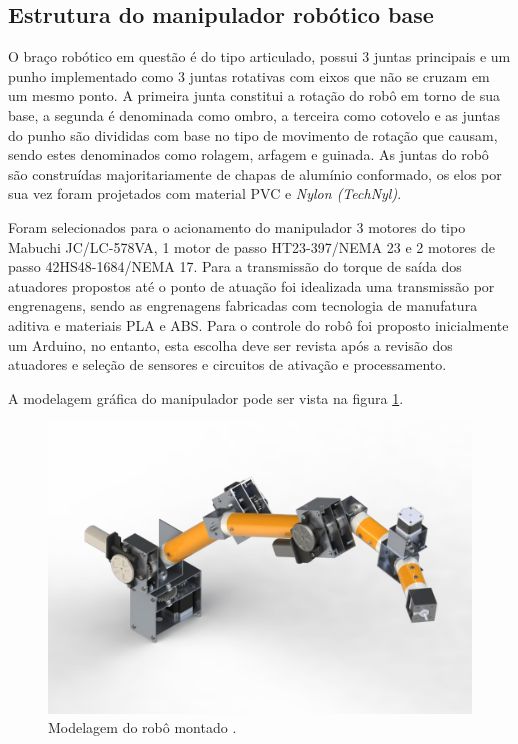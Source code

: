 \subsection{Estrutura do manipulador robótico base}
\label{sec:EstruturaBase}

O braço robótico em questão é do tipo articulado, possui 3 juntas principais e um punho implementado como 3 juntas rotativas com eixos que não se cruzam em um
mesmo ponto. A primeira junta constitui a rotação do robô em torno de sua base, a segunda é denominada como ombro, a terceira como cotovelo e as juntas do 
punho são divididas com base no tipo de movimento de rotação que causam, sendo estes denominados como rolagem, arfagem e guinada. As juntas do robô são 
construídas majoritariamente de chapas de alumínio conformado, os elos por sua vez foram projetados com material PVC e \textit{Nylon (TechNyl)}. 

Foram selecionados para o acionamento do manipulador 3 motores do tipo Mabuchi JC/LC-578VA, 1 motor de passo HT23-397/NEMA 23 e 2 motores de passo 
42HS48-1684/NEMA 17. Para a transmissão do torque de saída dos atuadores propostos até o ponto de atuação foi idealizada uma transmissão por engrenagens,
sendo as engrenagens fabricadas com tecnologia de manufatura aditiva e materiais PLA e ABS. Para o controle do robô foi proposto inicialmente um Arduino, 
no entanto, esta escolha deve ser revista após a revisão dos atuadores e seleção de sensores e circuitos de ativação e processamento. 

A modelagem gráfica do manipulador pode ser vista na figura \ref{fig:manipulador-base}.

\begin{figure}[h]
\caption{Modelagem do robô montado \cite{fernando2019assistivo}.}    
\begin{centering}
\includegraphics[width=0.9\columnwidth]{images/intro/manipulador-base.png}
\par\end{centering}

\label{fig:manipulador-base}
\end{figure}


